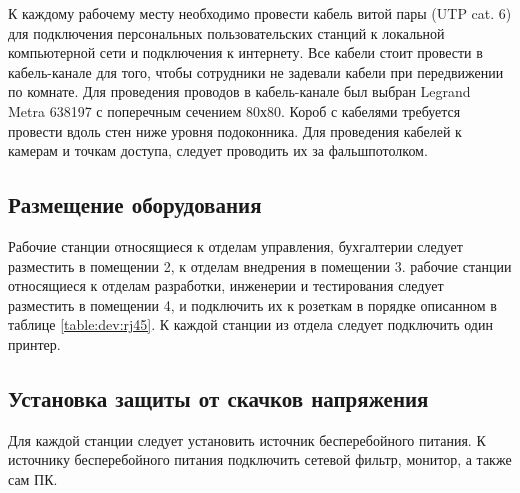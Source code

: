 К каждому рабочему месту необходимо провести кабель витой пары (UTP cat. 6) для подключения персональных пользовательских 
станций к локальной компьютерной сети и подключения к интернету. Все кабели стоит провести в кабель-канале для того, чтобы сотрудники 
не задевали кабели при передвижении по комнате. Для проведения проводов в кабель-канале был выбран Legrand
Metra 638197 с поперечным сечением 80х80.
Короб с кабелями требуется провести вдоль стен ниже уровня подоконника.
Для проведения кабелей к камерам и точкам доступа, следует проводить их за фальшпотолком. 

\subsection{Размещение оборудования}

Рабочие станции относящиеся к отделам управления, бухгалтерии  следует разместить в помещении 2, к отделам внедрения в
помещении 3.
рабочие станции относящиеся к отделам разработки, инженерии и тестирования следует разместить в помещении 4, 
и подключить их к розеткам в порядке описанном в таблице \ref{table:dev:rj45}. К каждой станции из отдела следует 
подключить один принтер.

\subsection{Установка защиты от скачков напряжения}

Для каждой станции следует установить источник бесперебойного питания. К источнику бесперебойного питания подключить сетевой 
фильтр, монитор, а также сам ПК.
